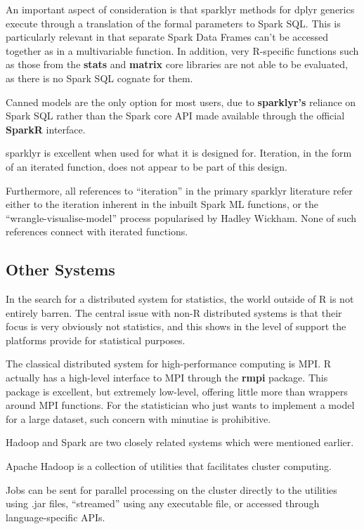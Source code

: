An important aspect of consideration is that sparklyr methods for dplyr
generics execute through a translation of the formal parameters to Spark
SQL. This is particularly relevant in that separate Spark Data Frames
can't be accessed together as in a multivariable function. In addition,
very R-specific functions such as those from the \textbf{stats} and
\textbf{matrix} core libraries are not able to be evaluated, as there is
no Spark SQL cognate for them.

Canned models are the only option for most users, due to
\textbf{sparklyr's} reliance on Spark SQL rather than the Spark core API
made available through the official \textbf{SparkR} interface.

sparklyr is excellent when used for what it is designed for. Iteration,
in the form of an iterated function, does not appear to be part of this
design.

Furthermore, all references to ``iteration'' in the primary sparklyr
literature refer either to the iteration inherent in the inbuilt Spark
ML functions, or the ``wrangle-visualise-model'' process popularised by
Hadley Wickham\cite{luraschi2019mastering}\cite{wickham2016r}. None of such
references connect with iterated functions.

\hypertarget{other-systems}{%
	\subsection{Other Systems}\label{other-systems}}

In the search for a distributed system for statistics, the world outside
of R is not entirely barren. The central issue with non-R distributed
systems is that their focus is very obviously not statistics, and this
shows in the level of support the platforms provide for statistical
purposes.

The classical distributed system for high-performance computing is MPI.
R actually has a high-level interface to MPI through the \textbf{rmpi}
package. This package is excellent, but extremely low-level, offering
little more than wrappers around MPI functions. For the statistician who
just wants to implement a model for a large dataset, such concern with
minutiae is prohibitive.

Hadoop and Spark are two closely related systems which were mentioned
earlier.

Apache Hadoop is a collection of utilities that facilitates cluster
computing.

Jobs can be sent for parallel processing on the cluster directly to the
utilities using .jar files, ``streamed'' using any executable file, or
accessed through language-specific APIs.


